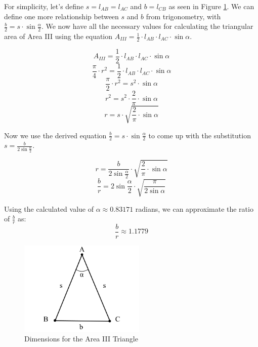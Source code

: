 \documentclass[a4paper,11pt]{article}
\begin{document}
For simplicity, let's define $s=l_{AB}=l_{AC}$ and $b=l_{CB}$ as seen in Figure \ref{fig:triangle}.  We can define one more relationship between $s$ and $b$ from trigonometry, with $\frac{b}{2} = s \cdot \sin{\frac{\alpha}{2}}$. We now have all the necessary values for calculating the triangular area of Area III using the equation $A_{III} = \frac{1}{2} \cdot l_{AB} \cdot l_{AC} \cdot \sin{\alpha}$.  


\[A_{III} = \frac{1}{2} \cdot l_{AB} \cdot l_{AC} \cdot \sin{\alpha}\]
\[\frac{\pi}{4} \cdot r^2 = \frac{1}{2} \cdot l_{AB} \cdot l_{AC} \cdot \sin{\alpha}\]
\[\frac{\pi}{2} \cdot r^2 = s^2 \cdot \sin{\alpha}\]
\[r^2 = s^2 \cdot \frac{2}{\pi} \cdot \sin{\alpha}\]
\[r =s \cdot \sqrt{\frac{2}{\pi} \cdot \sin{\alpha}}\]

Now we use the derived equation $\frac{b}{2} = s \cdot \sin{\frac{\alpha}{2}}$ to come up with the substitution $s =\frac{b}{2\sin{\frac{\alpha}{2}}}$.

\[r =\frac{b}{2\sin{\frac{\alpha}{2}}} \cdot \sqrt{\frac{2}{\pi} \cdot \sin{\alpha}}\]
\[\frac{b}{r} = 2\sin{\frac{\alpha}{2}} \cdot \sqrt{\frac{\pi}{2\sin{\alpha}}}\]

Using the calculated value of $\alpha \approx 0.83171 $ radians, we can approximate the ratio of $\frac{b}{r}$ as:
\[\frac{b}{r} \approx 1.1779\]


\begin{figure}[htp]
    \centering
    \includegraphics[width=6cm]{Images/Triangle_3_Area.png}
    \caption{Dimensions for the Area III Triangle}
    \label{fig:triangle}
\end{figure}
\end{document}
